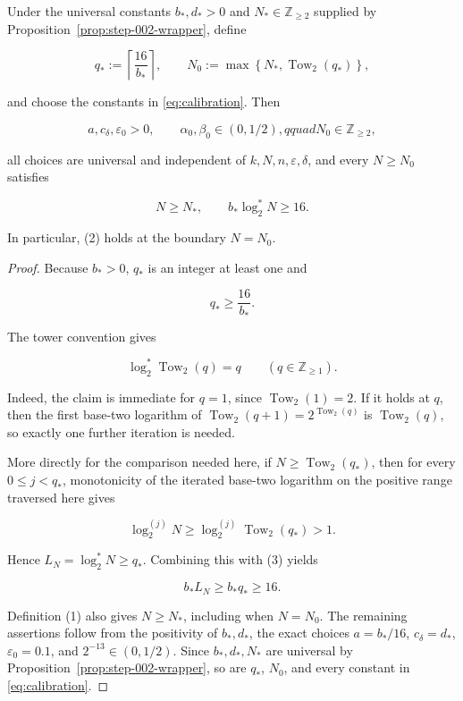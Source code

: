 \begin{lemma}\label{lem:step-005-calibration}
Under the universal constants \(b_*,d_*>0\) and
\(N_*\in\mathbb Z_{\ge2}\) supplied by Proposition~\ref{prop:step-002-wrapper}, define

\[
q_*:=\left\lceil\frac{16}{b_*}\right\rceil,
\qquad
N_0:=\max\left\{N_*,\operatorname{Tow}_2(q_*)\right\},
\tag{1}
\]

and choose the constants in \eqref{eq:calibration}. Then

\[
a,c_\delta,\varepsilon_0>0,\qquad
\alpha_0,\beta_0\in(0,1/2),qquad
N_0\in\mathbb Z_{\ge2},
\]

all choices are universal and independent of \(k,N,n,\varepsilon,\delta\),
and every \(N\ge N_0\) satisfies

\[
N\ge N_*,
\qquad
b_*\log_2^*N\ge16.
\tag{2}
\]

In particular, (2) holds at the boundary \(N=N_0\).
\end{lemma}

\begin{proof}
Because \(b_*>0\), \(q_*\) is an integer at least one and

\[
q_*\ge\frac{16}{b_*}.
\tag{3}
\]

The tower convention gives

\[
\log_2^*\operatorname{Tow}_2(q)=q
\qquad(q\in\mathbb Z_{\ge1}).
\tag{4}
\]

Indeed, the claim is immediate for \(q=1\), since
\(\operatorname{Tow}_2(1)=2\). If it holds at \(q\), then the first
base-two logarithm of
\(\operatorname{Tow}_2(q+1)=2^{\operatorname{Tow}_2(q)}\) is
\(\operatorname{Tow}_2(q)\), so exactly one further iteration is needed.

More directly for the comparison needed here, if
\(N\ge\operatorname{Tow}_2(q_*)\), then for every
\(0\le j<q_*\), monotonicity of the iterated base-two logarithm on the
positive range traversed here gives

\[
\log_2^{(j)}N
\ge
\log_2^{(j)}\operatorname{Tow}_2(q_*)
>1.
\]

Hence \(L_N=\log_2^*N\ge q_*\). Combining this with (3) yields

\[
b_*L_N\ge b_*q_*\ge16.
\tag{5}
\]

Definition (1) also gives \(N\ge N_*\), including when \(N=N_0\).
The remaining assertions follow from the positivity of
\(b_*,d_*\), the exact choices
\(a=b_*/16\), \(c_\delta=d_*\), \(\varepsilon_0=0.1\), and
\(2^{-13}\in(0,1/2)\). Since \(b_*,d_*,N_*\) are universal by
Proposition~\ref{prop:step-002-wrapper},
so are \(q_*\), \(N_0\), and every constant in
\eqref{eq:calibration}. \end{proof}

